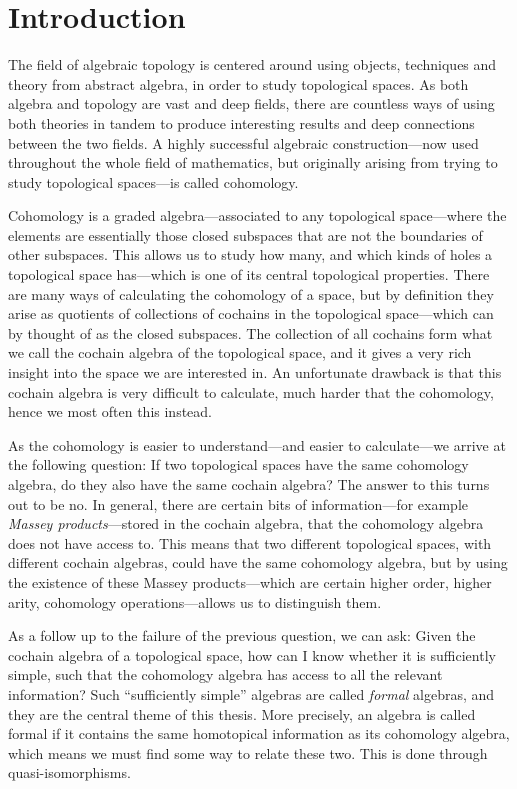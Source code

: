 
\section{Introduction}

The field of algebraic topology is centered around using objects, techniques and theory from abstract algebra, in order to study topological spaces. As both algebra and topology are vast and deep fields, there are countless ways of using both theories in tandem to produce interesting results and deep connections between the two fields. A highly successful algebraic construction---now used throughout the whole field of mathematics, but originally arising from trying to study topological spaces---is called cohomology. 

Cohomology is a graded algebra---associated to any topological space---where the elements are essentially those closed subspaces that are not the boundaries of other subspaces. This allows us to study how many, and which kinds of holes a topological space has---which is one of its central topological properties. There are many ways of calculating the cohomology of a space, but by definition they arise as quotients of collections of cochains in the topological space---which can by thought of as the closed subspaces. The collection of all cochains form what we call the cochain algebra of the topological space, and it gives a very rich insight into the space we are interested in. An unfortunate drawback is that this cochain algebra is very difficult to calculate, much harder that the cohomology, hence we most often this instead.

As the cohomology is easier to understand---and easier to calculate---we arrive at the following question: If two topological spaces have the same cohomology algebra, do they also have the same cochain algebra? The answer to this turns out to be no. In general, there are certain bits of information---for example \emph{Massey products}---stored in the cochain algebra, that the cohomology algebra does not have access to. This means that two different topological spaces, with different cochain algebras, could have the same cohomology algebra, but by using the existence of these Massey products---which are certain higher order, higher arity, cohomology operations---allows us to distinguish them. 

As a follow up to the failure of the previous question, we can ask: Given the cochain algebra of a topological space, how can I know whether it is sufficiently simple, such that the cohomology algebra has access to all the relevant information? Such ``sufficiently simple'' algebras are called \emph{formal} algebras, and they are the central theme of this thesis. More precisely, an algebra is called formal if it contains the same homotopical information as its cohomology algebra, which means we must find some way to relate these two. This is done through quasi-isomorphisms. 

